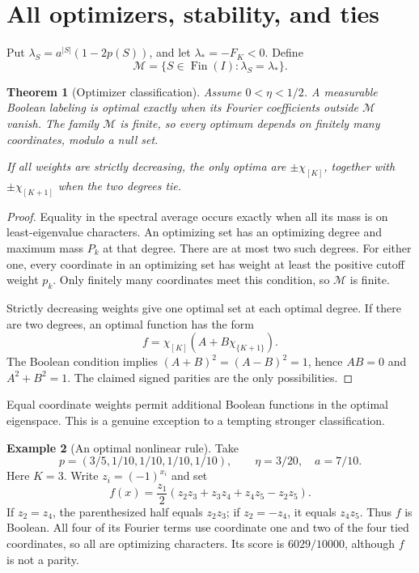 \documentclass[11pt,a4paper]{article}
\newtheorem{theorem}{Theorem}[section]
\theoremstyle{definition}
\newtheorem{example}[theorem]{Example}
\theoremstyle{remark}
\newcommand{\Fin}{\operatorname{Fin}}
\begin{document}
\section{All optimizers, stability, and ties}\label{np:sec:stability}

Put \(\lambda_S=a^{|S|}(1-2p(S))\), and let
\(\lambda_*=-F_K<0\). Define
\[
 \mathcal M=\{S\in\Fin(I):\lambda_S=\lambda_*\}.
\]

\begin{theorem}[Optimizer classification]\label{np:thm:optimizers}
Assume \(0<\eta<1/2\).
A measurable Boolean labeling is optimal exactly when its Fourier
coefficients outside \(\mathcal M\) vanish. The family \(\mathcal M\)
is finite, so every optimum depends on finitely many coordinates, modulo
a null set.

If all weights are strictly decreasing, the only optima are
\(\pm\chi_{[K]}\), together with \(\pm\chi_{[K+1]}\) when the two degrees tie.
\end{theorem}
\begin{proof}
Equality in the spectral average occurs exactly when all its mass is on
least-eigenvalue characters. An optimizing set has an optimizing degree
and maximum mass \(P_k\) at that degree. There are at most two such degrees.
For either one, every coordinate in an optimizing set has weight at least
the positive cutoff weight \(p_k\). Only finitely many coordinates meet
this condition, so \(\mathcal M\) is finite.

Strictly decreasing weights give one optimal set at each optimal degree.
If there are two degrees, an optimal function has the form
\[
 f=\chi_{[K]}(A+B\chi_{\{K+1\}}).
\]
The Boolean condition implies \((A+B)^2=(A-B)^2=1\), hence
\(AB=0\) and \(A^2+B^2=1\). The claimed signed parities are the only
possibilities.
\end{proof}

Equal coordinate weights permit additional Boolean functions in the
optimal eigenspace. This is a genuine exception to a tempting stronger
classification.

\begin{example}[An optimal nonlinear rule]\label{np:ex:nonlinear}
Take
\[
 p=(3/5,1/10,1/10,1/10,1/10),\qquad
 \eta=3/20,\quad a=7/10.
\]
Here \(K=3\). Write \(z_i=(-1)^{x_i}\) and set
\[
 f(x)=\frac{z_1}{2}
 (z_2z_3+z_3z_4+z_4z_5-z_2z_5).
\]
If \(z_2=z_4\), the parenthesized half equals \(z_2z_3\); if
\(z_2=-z_4\), it equals \(z_4z_5\). Thus \(f\) is Boolean.
All four of its Fourier terms use coordinate one and two of the
four tied coordinates, so all are optimizing characters.
Its score is \(6029/10000\), although \(f\) is not a parity.
\end{example}
\end{document}
